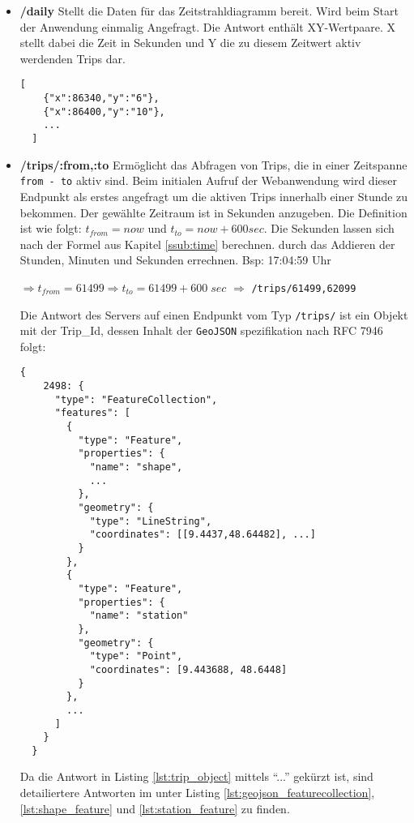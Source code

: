     \begin{itemize}[label={}]
      \item \textbf{/daily} Stellt die Daten für das Zeitstrahldiagramm bereit. Wird beim Start der Anwendung einmalig Angefragt. Die Antwort enthält XY-Wertpaare. X stellt dabei die Zeit in Sekunden und Y die zu diesem Zeitwert aktiv werdenden Trips dar.

  \begin{lstlisting}[captionpos=t, caption=Antwort des Servers zur Anfrage \texttt{/daily}, label=lst:daily_response]
  [
    {"x":86340,"y":"6"},
    {"x":86400,"y":"10"}, 
    ...
  ]
  \end{lstlisting}

      \item \textbf{/trips/:from,:to} Ermöglicht das Abfragen von Trips, die in einer Zeitspanne \texttt{from - to} aktiv sind. Beim initialen Aufruf der Webanwendung wird dieser Endpunkt als erstes angefragt um die aktiven Trips innerhalb einer Stunde zu bekommen. Der gewählte Zeitraum ist in Sekunden anzugeben. Die Definition ist wie folgt: $t_{from} = now$ und $t_{to} = now + 600 sec$. Die Sekunden lassen sich nach der Formel aus Kapitel \ref{ssub:time} berechnen.
       durch das Addieren der Stunden, Minuten und Sekunden errechnen. Bsp: 17:04:59 Uhr

      $\Rightarrow t_{from} = 61499 \Rightarrow t_{to} = 61499 + 600\;sec$ $\Rightarrow$ \texttt{/trips/61499,62099}

      Die Antwort des Servers auf einen Endpunkt vom Typ \texttt{/trips/} ist ein Objekt mit der Trip\_Id, dessen Inhalt der \texttt{GeoJSON} spezifikation nach RFC 7946 folgt:

  \begin{lstlisting}[captionpos=t, caption=Trip Objekt, label=lst:trip_object]
  {
    2498: {  
      "type": "FeatureCollection",
      "features": [
        {
          "type": "Feature",
          "properties": {
            "name": "shape",
            ...
          },
          "geometry": {
            "type": "LineString",
            "coordinates": [[9.4437,48.64482], ...]
          }
        },
        {
          "type": "Feature",
          "properties": {
            "name": "station"
          },
          "geometry": {
            "type": "Point",
            "coordinates": [9.443688, 48.6448]
          }
        },
        ...
      ]
    }
  }
  \end{lstlisting}
    
      Da die Antwort in Listing \ref{lst:trip_object} mittels "`..."' gekürzt ist, sind detailiertere Antworten im  unter Listing \ref{lst:geojson_featurecollection}, \ref{lst:shape_feature} und \ref{lst:station_feature} zu finden.
    


\end{itemize}
